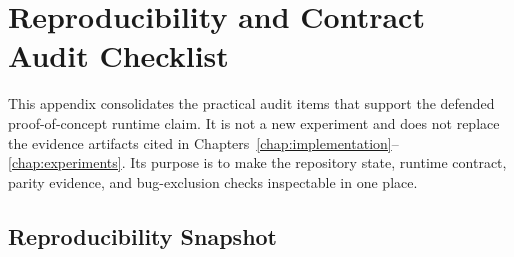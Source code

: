 \chapter{Reproducibility and Contract Audit Checklist}
\label{app:reproducibility_checklist}

This appendix consolidates the practical audit items that support the defended proof-of-concept runtime claim. It is not a new experiment and does not replace the evidence artifacts cited in Chapters~\ref{chap:implementation}--\ref{chap:experiments}. Its purpose is to make the repository state, runtime contract, parity evidence, and bug-exclusion checks inspectable in one place.

\section{Reproducibility Snapshot}

